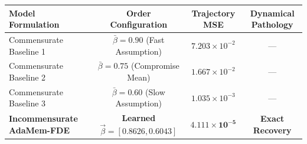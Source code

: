 \begin{tabular}{lccc}
\toprule
\textbf{Model Formulation} & \textbf{Order Configuration} & \textbf{Trajectory MSE} & \textbf{Dynamical Pathology} \\
\midrule
Commensurate Baseline 1 & $\bar{\beta} = 0.90$ (Fast Assumption) & $7.203 \times 10^{-2}$ & --- \\
Commensurate Baseline 2 & $\bar{\beta} = 0.75$ (Compromise Mean) & $1.667 \times 10^{-2}$ & --- \\
Commensurate Baseline 3 & $\bar{\beta} = 0.60$ (Slow Assumption) & $1.035 \times 10^{-3}$ & --- \\
\midrule
\textbf{Incommensurate AdaMem-FDE} & \textbf{Learned $\vec{\beta} = [0.8626, 0.6043]$} & $\mathbf{4.111 \times 10^{-5}}$ & \textbf{Exact Recovery} \\
\bottomrule
\end{tabular}